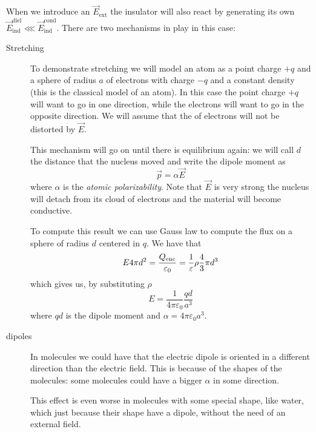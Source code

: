 \documentclass[12pt]{extarticle}
\begin{document}
When we introduce an $\vec E_\text{ext}$ the insulator will also react by generating its own $\vec E_\text{ind}^\text{diel} \lll \vec E^\text{cond}_\text{ind}$.
There are two mechanisms in play in this case:
\begin{description}
    \item[Stretching]
          To demonstrate stretching we will model an atom as a point charge $+q$ and a sphere of radius $a$ of electrons with charge $-q$ and a constant density (this is the classical model of an atom).
          In this case the point charge $+q$ will want to go in one direction, while the electrons will want to go in the opposite direction.
          We will assume that the  of electrons will not be distorted by $\vec E$.

          This mechanism will go on until there is equilibrium again:
          we will call $d$ the distance that the nucleus moved and write the dipole moment as
          \begin{equation}
              \vec p = \alpha \vec E
          \end{equation}
          where $\alpha$ is the \emph{atomic polarizability}.
          Note that $\vec E$ is very strong the nucleus will detach from its cloud of electrons and the material will become conductive.

          To compute this result we can use Gauss law to compute the flux on a sphere of radius $d$ centered in $q$.
          We have that
          \begin{equation}
              E 4 \pi d^2 = \frac{Q_\text{enc}}{\varepsilon_0} = \frac{1}{\varepsilon} \rho \frac{4}{3} \pi d^3
          \end{equation}
          which gives us, by substituting $\rho$
          \begin{equation}
              E = \frac{1}{4 \pi \varepsilon_0}\frac{qd}{a^3}
          \end{equation}
          where $qd$ is the dipole moment and $\alpha = 4 \pi \varepsilon_0 a^3$.
    \item[ dipoles]
          In molecules we could have that the electric dipole is oriented in a different direction than the electric field.
          This is because of the shapes of the molecules: some molecules could have a bigger $\alpha$ in some direction.

          This effect is even worse in molecules with some special shape, like water, which just because their shape have a dipole, without the need of an external field.


\end{description}
\end{document}
